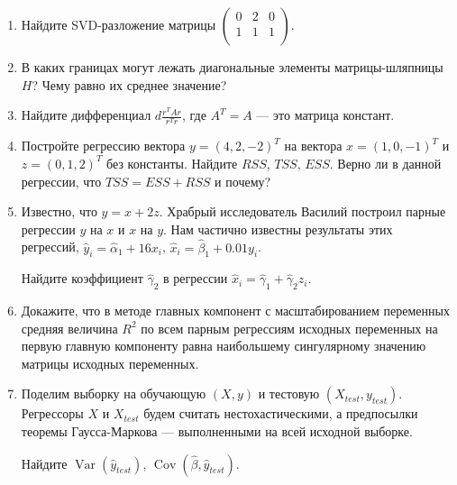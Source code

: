 \documentclass[12pt]{article} %
\theoremstyle{definition} %
\DeclareMathOperator{\Cov}{Cov}
\DeclareMathOperator{\Var}{Var}
\begin{document}
\begin{enumerate}
  \item Найдите SVD-разложение матрицы
  $\begin{pmatrix}
   0 & 2 & 0 \\
   1 & 1 & 1 \\
  \end{pmatrix}$.
  \item В каких границах могут лежать диагональные элементы матрицы-шляпницы $H$?
  Чему равно их среднее значение?
  \item Найдите дифференциал $d \frac{r^T Ar}{r^Tr}$, где $A^T=A$ — это матрица констант.
  \item Постройте регрессию вектора $y = (4,2,-2)^T$ на вектора $x=(1,0,-1)^T$ и $z=(0,1,2)^T$
  без константы. Найдите $RSS$, $TSS$, $ESS$. Верно ли в данной регрессии, что $TSS=ESS+RSS$ и почему?
  \item Известно, что $y=x+2z$. Храбрый исследователь Василий построил парные регрессии
  $y$ на $x$ и $x$ на $y$. Нам частично известны результаты этих регрессий, $\hat y_i = \hat\alpha_1 + 16 x_i$,
  $\hat x_i = \hat \beta_1 + 0.01 y_i$.

  Найдите коэффициент $\hat\gamma_2$ в регрессии $\hat x_i = \hat \gamma_1 + \hat\gamma_2 z_i$.
  \item Докажите, что в методе главных компонент с масштабированием переменных средняя величина $R^2$ по всем парным
  регрессиям исходных переменных на первую главную компоненту равна наибольшему сингулярному значению
  матрицы исходных переменных. 

  \item Поделим выборку на обучающую $(X, y)$ и тестовую $(X_{test}, y_{test})$.
  Регрессоры $X$ и $X_{test}$ будем считать нестохастическими, а предпосылки
  теоремы Гаусса-Маркова — выполненными на всей исходной выборке.

  Найдите $\Var(\hat y_{test})$, $\Cov(\hat \beta, \hat y_{test})$.
\end{enumerate}
\end{document}
